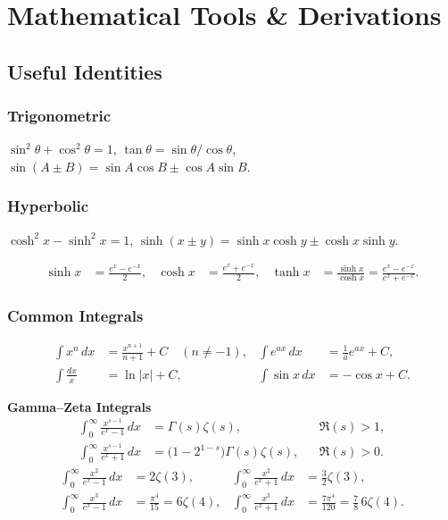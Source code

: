 \chapter{Mathematical Tools \& Derivations}

\section{Useful Identities}

\subsection*{Trigonometric}
$\sin^2\theta + \cos^2\theta = 1$,\quad
$\tan\theta = \sin\theta/\cos\theta$,\quad
$\sin(A\pm B) = \sin A\cos B \pm \cos A\sin B$.

\subsection*{Hyperbolic}
$\cosh^2 x - \sinh^2 x = 1$,\quad
$\sinh(x\pm y) = \sinh x\cosh y \pm \cosh x\sinh y$.

\begin{align*}
      \sinh x &= \frac{e^x - e^{-x}}{2}, &
      \cosh x &= \frac{e^x + e^{-x}}{2}, &
      \tanh x &= \frac{\sinh x}{\cosh x} = \frac{e^x - e^{-x}}{e^x + e^{-x}}.
\end{align*}

\subsection*{Common Integrals}
\begin{align*}
  \int x^n\,dx &= \tfrac{x^{n+1}}{n+1} + C \quad (n\neq-1), &
  \int e^{ax}\,dx &= \tfrac{1}{a}e^{ax}+C,\\
  \int \frac{dx}{x} &= \ln|x|+C, &
  \int \sin x\,dx &= -\cos x + C.
\end{align*}

\textbf{Gamma--Zeta Integrals}
\begin{align*}
      \int_0^\infty \frac{x^{s-1}}{e^x-1}\,dx &= \Gamma(s)\zeta(s), && \Re(s)>1,\\
      \int_0^\infty \frac{x^{s-1}}{e^x+1}\,dx &= \bigl(1-2^{1-s}\bigr)\Gamma(s)\zeta(s), && \Re(s)>0.
\end{align*}
\begin{align*}
      \int_0^\infty \frac{x^2}{e^x-1}\,dx &= 2\zeta(3), &
      \int_0^\infty \frac{x^2}{e^x+1}\,dx &= \tfrac{3}{2}\zeta(3),\\
      \int_0^\infty \frac{x^3}{e^x-1}\,dx &= \frac{\pi^4}{15}=6\zeta(4), &
      \int_0^\infty \frac{x^3}{e^x+1}\,dx &= \frac{7\pi^4}{120}=\tfrac{7}{8}\,6\zeta(4).
\end{align*}


